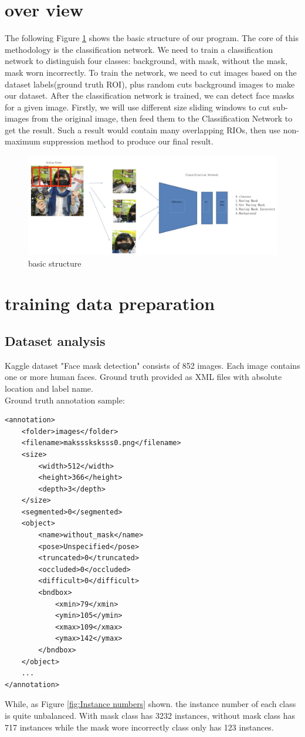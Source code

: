 \documentclass[10pt,a4paper]{report}
\begin{document}
\section{over view}
The following Figure \ref{fig:Basic Structure} shows the basic structure of our program. The core of this methodology is the classification network. We need to train a classification network to distinguish four classes: background, with mask, without the mask, mask worn incorrectly. To train the network, we need to cut images based on the dataset labels(ground truth ROI), plus random cuts background images to make our dataset. After the classification network is trained, we can detect face masks for a given image. Firstly, we will use different size sliding windows to cut sub-images from the original image, then feed them to the Classification Network to get the result. Such a result would contain many overlapping RIOs, then use non-maximum suppression method to produce our final result.
\begin{figure}[hbtp]

\centering
\includegraphics[scale=0.14]{imgs/workflow.png}
\caption{basic structure}
        \label{fig:Basic Structure}
\end{figure}

\section{training data preparation}
\subsection{Dataset analysis}
Kaggle dataset "Face mask detection" consists of 852 images. Each image contains one or more human faces. Ground truth provided as XML files with absolute location and label name. \\
Ground truth annotation sample:
\begin{lstlisting}
<annotation>
	<folder>images</folder>
	<filename>maksssksksss0.png</filename>
	<size>
		<width>512</width>
		<height>366</height>
		<depth>3</depth>
	</size>
	<segmented>0</segmented>
	<object>
		<name>without_mask</name>
		<pose>Unspecified</pose>
		<truncated>0</truncated>
		<occluded>0</occluded>
		<difficult>0</difficult>
		<bndbox>
			<xmin>79</xmin>
			<ymin>105</ymin>
			<xmax>109</xmax>
			<ymax>142</ymax>
		</bndbox>
	</object>
	...
</annotation>
\end{lstlisting}
While, as Figure \ref{fig:Instance numbers} shown. the instance number of each class is quite unbalanced. With mask class has 3232 instances, without mask class has 717 instances while the mask wore incorrectly class only has 123 instances. 
\end{document}
